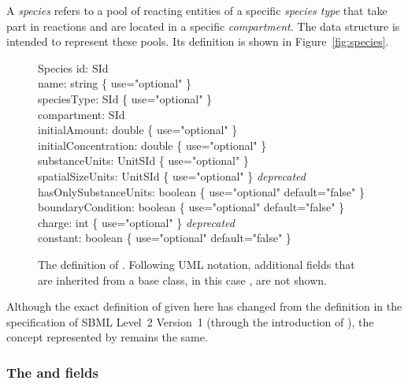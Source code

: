 A \emph{species} refers to a pool of reacting entities
of a specific \emph{species type} that take part in
reactions and are located in a specific \emph{compartment}.
The \Species data
structure is intended to represent these pools.   Its definition
is shown in Figure~\vref{fig:species}.

\begin{figure}[htb]
  \centering
  \begin{classbox}{Species}
    id: SId                                                             \\
    name: string \{ use="optional" \}                                   \\
    speciesType: SId \{ use="optional" \}                 \\
    compartment: SId                                                    \\
    initialAmount: double \{ use="optional" \}                          \\
    initialConcentration: double \{ use="optional" \}                  \\
    substanceUnits: UnitSId \{ use="optional" \}          \\
    spatialSizeUnits: UnitSId \{ use="optional" \} \emph{deprecated}        \\
    hasOnlySubstanceUnits: boolean \{ use="optional" default="false" \} \\
    boundaryCondition: boolean \{ use="optional" default="false" \}     \\
    charge: int \{ use="optional" \} \emph{deprecated}    \\
    constant: boolean \{ use="optional" default="false" \}              \\
  \end{classbox}
  \caption{The definition of \Species.  Following UML notation,
    additional fields
    that are inherited from a base class, in this case \SBase, are not shown.}
  \label{fig:species}
\end{figure}

Although the exact definition of \Species given here has
changed from the definition in the specification of SBML Level~2
Version~1 (\ie through the introduction of \SpeciesType), the
concept represented by \Species remains the same.



\subsubsection{The  and  fields}

